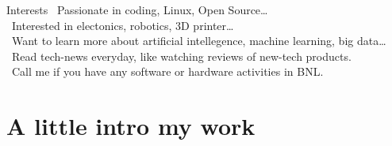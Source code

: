 \documentclass[
mode=present,
nohandoutpagebreaks,
nohandoutframes,
size=12pt,
style=huskyinverse,
hlsections,
slidesnotes,
pauseslide,
clock,
]{powerdot}
\begin{document}
\begin{slide}{Interests}
    \textcolor{red}{}\ Passionate in coding, Linux, Open Source\dots \\
    \vspace{0.5cm}
    \textcolor{green}{}\ Interested in electonics, robotics, 3D printer\dots \\
    \vspace{0.5cm}
    \textcolor{red}{}\ Want to learn more about artificial intellegence, machine learning, big data\dots \\
    \vspace{0.5cm}
    \textcolor{green}{}\ Read tech-news everyday, like watching reviews of new-tech products. \\
    \vspace{0.5cm}
    \textcolor{red}{}\ Call me if you have any software or hardware activities in BNL.
\end{slide}

\section[
]{A little intro my work}
\end{document}

